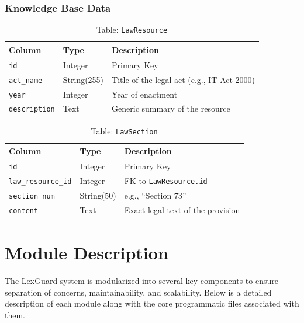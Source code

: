\documentclass[a4paper,12pt]{report}
\begin{document}
\subsubsection*{Knowledge Base Data}

\begin{table}[H]
\centering
\caption{Table: \texttt{LawResource}}
\vspace{6pt}
\renewcommand{\arraystretch}{1.3}
\begin{tabular}{|l|l|p{7cm}|}
\hline
\textbf{Column} & \textbf{Type} & \textbf{Description} \\
\hline
\texttt{id}          & Integer    & Primary Key \\
\texttt{act\_name}   & String(255)& Title of the legal act (e.g., IT Act 2000) \\
\texttt{year}        & Integer    & Year of enactment \\
\texttt{description} & Text       & Generic summary of the resource \\
\hline
\end{tabular}
\label{tab:db_lawres}
\end{table}

\begin{table}[H]
\centering
\caption{Table: \texttt{LawSection}}
\vspace{6pt}
\renewcommand{\arraystretch}{1.3}
\begin{tabular}{|l|l|p{7cm}|}
\hline
\textbf{Column} & \textbf{Type} & \textbf{Description} \\
\hline
\texttt{id}             & Integer & Primary Key \\
\texttt{law\_resource\_id}& Integer & FK to \texttt{LawResource.id} \\
\texttt{section\_num}   & String(50) & e.g., ``Section 73'' \\
\texttt{content}        & Text    & Exact legal text of the provision \\
\hline
\end{tabular}
\label{tab:db_lawsec}
\end{table}

\section{Module Description}

The LexGuard system is modularized into several key components to ensure separation of concerns, maintainability, and scalability. Below is a detailed description of each module along with the core programmatic files associated with them.
\end{document}
